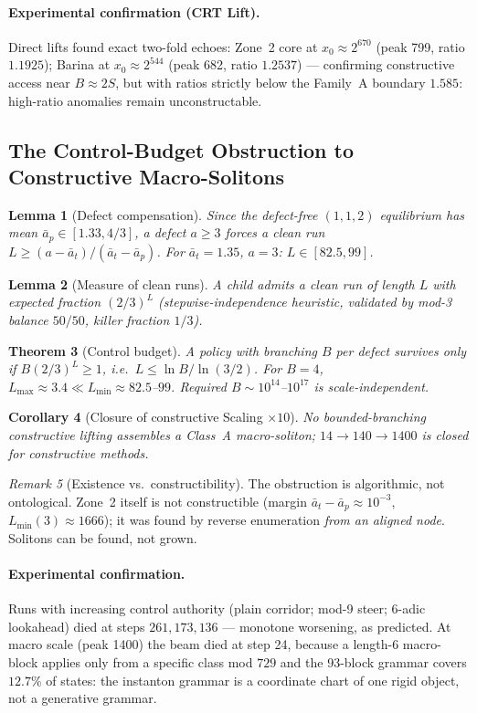\documentclass[12pt,a4paper]{article}
\newtheorem{theorem}{Theorem}[section]
\newtheorem{lemma}[theorem]{Lemma}
\newtheorem{corollary}[theorem]{Corollary}
\theoremstyle{remark}
\newtheorem{remark}[theorem]{Remark}
\begin{document}
\paragraph{Experimental confirmation (CRT Lift).} Direct lifts found exact two-fold echoes: Zone~2 core at $x_0\approx2^{670}$ (peak 799, ratio $1.1925$); Barina at $x_0\approx2^{544}$ (peak 682, ratio $1.2537$) --- confirming constructive access near $B\approx2S$, but with ratios strictly below the Family~A boundary $1.585$: high-ratio anomalies remain unconstructable.

\subsection{The Control-Budget Obstruction to Constructive Macro-Solitons}
\begin{lemma}[Defect compensation]
Since the defect-free $(1,1,2)$ equilibrium has mean $\bar a_p\in[1.33,4/3]$, a defect $a\ge3$ forces a clean run $L\ge(a-\bar a_t)/(\bar a_t-\bar a_p)$. For $\bar a_t=1.35$, $a=3$: $L\in[82.5,99]$.
\end{lemma}
\begin{lemma}[Measure of clean runs]
A child admits a clean run of length $L$ with expected fraction $(2/3)^L$ (stepwise-independence heuristic, validated by mod-3 balance $50/50$, killer fraction $1/3$).
\end{lemma}
\begin{theorem}[Control budget]
A policy with branching $B$ per defect survives only if $B(2/3)^L\ge1$, i.e.\ $L\le\ln B/\ln(3/2)$. For $B=4$, $L_{\max}\approx3.4\ll L_{\min}\approx82.5$--$99$. Required $B\sim10^{14}$--$10^{17}$ is scale-independent.
\end{theorem}
\begin{corollary}[Closure of constructive Scaling $\times10$]
No bounded-branching constructive lifting assembles a Class~A macro-soliton; $14\to140\to1400$ is closed for constructive methods.
\end{corollary}
\begin{remark}[Existence vs.\ constructibility]
The obstruction is algorithmic, not ontological. Zone~2 itself is not constructible (margin $\bar a_t-\bar a_p\approx10^{-3}$, $L_{\min}(3)\approx1666$); it was found by reverse enumeration \emph{from an aligned node}. Solitons can be found, not grown.
\end{remark}
\paragraph{Experimental confirmation.} Runs with increasing control authority (plain corridor; mod-9 steer; 6-adic lookahead) died at steps $261,173,136$ --- monotone worsening, as predicted. At macro scale (peak 1400) the beam died at step 24, because a length-6 macro-block applies only from a specific class mod $729$ and the 93-block grammar covers $12.7\%$ of states: the instanton grammar is a coordinate chart of one rigid object, not a generative grammar.
\end{document}
